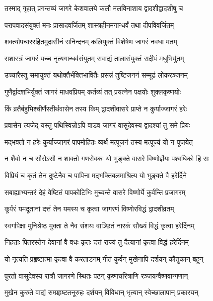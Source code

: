 \twolineshloka
{तस्माद् गृहात् प्रगन्तव्यं जागरे केशवालये}
{कलौ मलविनाशाय द्वादशीद्वादशीषु च}%

\twolineshloka
{परापवादसंयुक्तं मनः प्रासादवर्जितम्}
{शास्त्रहीनमगान्धर्वं तथा दीपविवर्जितम्}%

\twolineshloka
{शक्त्योपचाररहितमुदासीनं सनिन्दनम्}
{कलियुक्तं विशेषेण जागरं नवधा मतम्}%

\twolineshloka
{सशास्त्रं जागरं यच्च नृत्यगान्धर्वसंयुतम्}
{सवाद्यं तालासंयुक्तं सदीपं मधुभिर्युतम्}%

\twolineshloka
{उच्चारैस्तु समायुक्तं यथोक्तैर्भक्तिभावितैः}
{प्रसन्नं तुष्टिजननं सम्मूढं लोकरञ्जनम्}%

\twolineshloka
{गुणैर्द्वादशभिर्युक्तं जागरं माधवप्रियम्}
{कर्तव्यं तत् प्रयत्नेन पक्षयोः शुक्लकृष्णयोः}%

\twolineshloka
{किं व्रतैर्बहुभिश्चीर्णैस्तीर्थवासेन तस्य किम्}
{द्वादशीवासरे प्राप्ते न कुर्याज्जागरं हरेः}%

\twolineshloka
{प्रवासेन त्यजेद् यस्तु पथिस्विन्नोऽपि वाडव}
{जागरं वासुदेवस्य द्वादश्यां तु समे प्रियः}%

\twolineshloka
{मद्भक्तो न हरेः कुर्याज्जागरं पापमोहितः}
{व्यर्थं मत्पूजनं तस्य मत्पूज्यं यो न पूजयेत्}%

\twolineshloka
{न शैवो न च सौरोऽसौ न शाक्तो गणसेवकः}
{यो भुङ्क्ते वासरे विष्णोर्ज्ञेयः पश्वधिको हि सः}%

\twolineshloka
{विप्रियं च कृतं तेन दुष्टेनैव च पापिना}
{मद्भक्तिबलमाश्रित्य यो भुङ्क्ते वै हरेर्दिने}%

\twolineshloka
{सबाह्याभ्यन्तरं देहं वेष्टितं पापकोटिभिः}
{मुच्यन्ते वासरे विष्णोर्ये कुर्वन्ति प्रजागरम्}%

\twolineshloka
{कूर्परं यमदूतानां दत्तं तेन यमस्य च}
{कृत्वा जागरणं विष्णोरविद्धं द्वादशीव्रतम्}%

\twolineshloka
{स्वर्गापेक्षा मुनिश्रेष्ठ मुक्ता ते नैव संशयः}
{वाञ्छितं नारकं सौख्यं विद्धं कृत्वा हरेर्दिनम्}%

\twolineshloka
{निहताः पितरस्तेन देवानां वै वधः कृतः}
{दत्तं राज्यं तु दैत्यानां कृत्वा विद्धं हरेर्दिनम्}%

\twolineshloka
{यो नृत्यति प्रहृष्टात्मा कृत्वा वै करताडनम्}
{गीतं कुर्वन् मुखेनापि दर्शयन् कौतुकान् बहून्}%

\twolineshloka
{पुरतो वासुदेवस्य रात्रौ जागरणे स्थितः}
{पठन् कृष्णचरित्राणि रञ्जयन्वैष्णवान्गणान्}%

\twolineshloka
{मुखेन कुरुते वाद्यं सम्प्रहृष्टतनूरुहः}
{दर्शयन् विविधान् भृत्यान् स्वेच्छालापान् प्रकारयन्}%

